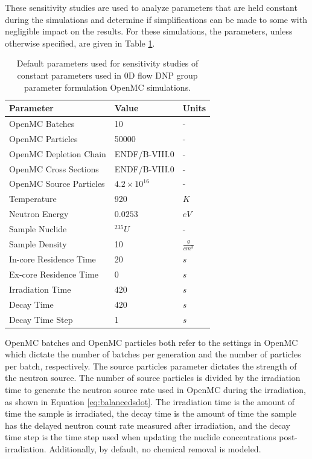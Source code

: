 These sensitivity studies are used to analyze parameters that are held constant during the simulations and determine if simplifications can be made to some with negligible impact on the results.
For these simulations, the parameters, unless otherwise specified, are given in Table \ref{tab:params-const}.

\begin{table}[H]
    \centering
    \begin{tabular}{lll}
        \hline
       Parameter  & Value & Units \\
       \hline
        OpenMC Batches & 10 & - \\
        OpenMC Particles & 50000 & - \\
        OpenMC Depletion Chain & ENDF/B-VIII.0 & - \\
        OpenMC Cross Sections & ENDF/B-VIII.0 & - \\
        OpenMC Source Particles & $4.2\times 10^{16}$ & -\\
        Temperature & 920 & $K$\\
        Neutron Energy & $0.0253$ & $eV$\\
        Sample Nuclide & $^{235}U$ & -\\
        Sample Density & 10 & $\frac{g}{cm^3}$\\
        In-core Residence Time & 20 & $s$\\
        Ex-core Residence Time & 0 & $s$\\
        Irradiation Time & 420 & $s$\\
        Decay Time & 420 & $s$\\
        Decay Time Step & 1 & $s$\\
        \hline
    \end{tabular}
    \caption{Default parameters used for sensitivity studies of constant parameters used in 0D flow \gls{DNP} group parameter formulation OpenMC simulations.}
    \label{tab:params-const}
\end{table}

OpenMC batches and OpenMC particles both refer to the settings in OpenMC which dictate the number of batches per generation and the number of particles per batch, respectively.
The source particles parameter dictates the strength of the neutron source.
The number of source particles is divided by the irradiation time to generate the neutron source rate used in OpenMC during the irradiation, as shown in Equation \eqref{eq:balancedsdot}.
The irradiation time is the amount of time the sample is irradiated, the decay time is the amount of time the sample has the delayed neutron count rate measured after irradiation, and the decay time step is the time step used when updating the nuclide concentrations post-irradiation.
Additionally, by default, no chemical removal is modeled.

